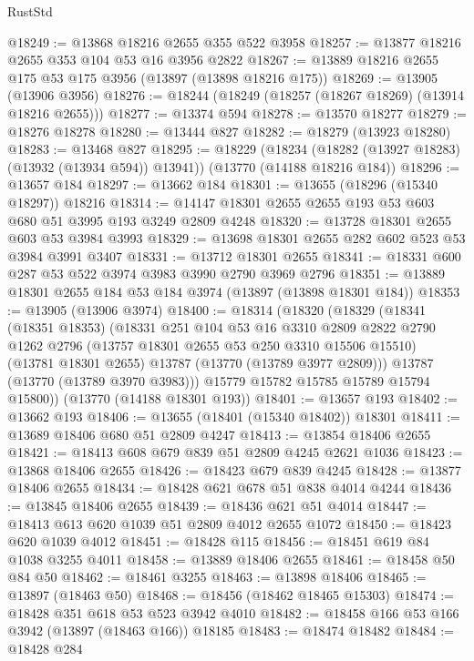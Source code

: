\begin{lexlean}{RustStd}
\begin{coremodule}
@18249 := @13868 @18216 @2655 @355 @522 @3958
@18257 := @13877 @18216 @2655 @353 @104 @53 @16 @3956 @2822
@18267 := @13889 @18216 @2655 @175 @53 @175 @3956 (@13897 (@13898 @18216 @175))
@18269 := @13905 (@13906 @3956)
@18276 := @18244 (@18249 (@18257 (@18267 @18269) (@13914 @18216 @2655)))
@18277 := @13374 @594
@18278 := @13570 @18277
@18279 := @18276 @18278
@18280 := @13444 @827
@18282 := @18279 (@13923 @18280)
@18283 := @13468 @827
@18295 := @18229
    (@18234 (@18282 (@13927 @18283) (@13932 (@13934 @594)) @13941))
    (@13770 (@14188 @18216 @184))
@18296 := @13657 @184
@18297 := @13662 @184
@18301 := @13655 (@18296 (@15340 @18297)) @18216
@18314 := @14147 @18301 @2655 @2655 @193 @53 @603 @680 @51 @3995 @193 @3249 @2809 @4248
@18320 := @13728 @18301 @2655 @603 @53 @3984 @3993
@18329 := @13698 @18301 @2655 @282 @602 @523 @53 @3984 @3991 @3407
@18331 := @13712 @18301 @2655
@18341 := @18331 @600 @287 @53 @522 @3974 @3983 @3990 @2790 @3969 @2796
@18351 := @13889 @18301 @2655 @184 @53 @184 @3974 (@13897 (@13898 @18301 @184))
@18353 := @13905 (@13906 @3974)
@18400 := @18314
    (@18320
      (@18329
        (@18341
          (@18351 @18353)
          (@18331
            @251
            @104
            @53
            @16
            @3310
            @2809
            @2822
            @2790
            @1262
            @2796
            (@13757 @18301 @2655 @53 @250 @3310 @15506 @15510)
            (@13781 @18301 @2655)
            @13787
            (@13770 (@13789 @3977 @2809)))
          @13787
          (@13770 (@13789 @3970 @3983)))
        @15779
        @15782
        @15785
        @15789
        @15794
        @15800))
    (@13770 (@14188 @18301 @193))
@18401 := @13657 @193
@18402 := @13662 @193
@18406 := @13655 (@18401 (@15340 @18402)) @18301
@18411 := @13689 @18406 @680 @51 @2809 @4247
@18413 := @13854 @18406 @2655
@18421 := @18413 @608 @679 @839 @51 @2809 @4245 @2621 @1036
@18423 := @13868 @18406 @2655
@18426 := @18423 @679 @839 @4245
@18428 := @13877 @18406 @2655
@18434 := @18428 @621 @678 @51 @838 @4014 @4244
@18436 := @13845 @18406 @2655
@18439 := @18436 @621 @51 @4014
@18447 := @18413 @613 @620 @1039 @51 @2809 @4012 @2655 @1072
@18450 := @18423 @620 @1039 @4012
@18451 := @18428 @115
@18456 := @18451 @619 @84 @1038 @3255 @4011
@18458 := @13889 @18406 @2655
@18461 := @18458 @50 @84 @50
@18462 := @18461 @3255
@18463 := @13898 @18406
@18465 := @13897 (@18463 @50)
@18468 := @18456 (@18462 @18465 @15303)
@18474 := @18428 @351 @618 @53 @523 @3942 @4010
@18482 := @18458 @166 @53 @166 @3942 (@13897 (@18463 @166)) @18185
@18483 := @18474 @18482
@18484 := @18428 @284

\end{coremodule}
\end{lexlean}

